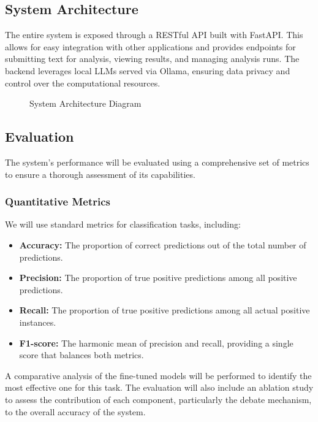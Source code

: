 \documentclass{article}
\begin{document}
\subsection{System Architecture}
The entire system is exposed through a RESTful API built with FastAPI. This allows for easy integration with other applications and provides endpoints for submitting text for analysis, viewing results, and managing analysis runs. The backend leverages local LLMs served via Ollama, ensuring data privacy and control over the computational resources.

\begin{figure}[h!]
    \centering
    
    \caption{System Architecture Diagram}
    \label{fig:system_architecture}
\end{figure}

\subsection{Evaluation}
The system's performance will be evaluated using a comprehensive set of metrics to ensure a thorough assessment of its capabilities.

\subsubsection{Quantitative Metrics}
We will use standard metrics for classification tasks, including:
\begin{itemize}
    \item \textbf{Accuracy:} The proportion of correct predictions out of the total number of predictions.
    \item \textbf{Precision:} The proportion of true positive predictions among all positive predictions.
    \item \textbf{Recall:} The proportion of true positive predictions among all actual positive instances.
    \item \textbf{F1-score:} The harmonic mean of precision and recall, providing a single score that balances both metrics.
\end{itemize}
A comparative analysis of the fine-tuned models will be performed to identify the most effective one for this task. The evaluation will also include an ablation study to assess the contribution of each component, particularly the debate mechanism, to the overall accuracy of the system.
\end{document}
